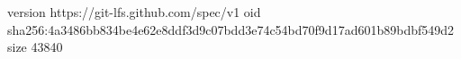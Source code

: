version https://git-lfs.github.com/spec/v1
oid sha256:4a3486bb834be4e62e8ddf3d9c07bdd3e74c54bd70f9d17ad601b89bdbf549d2
size 43840

